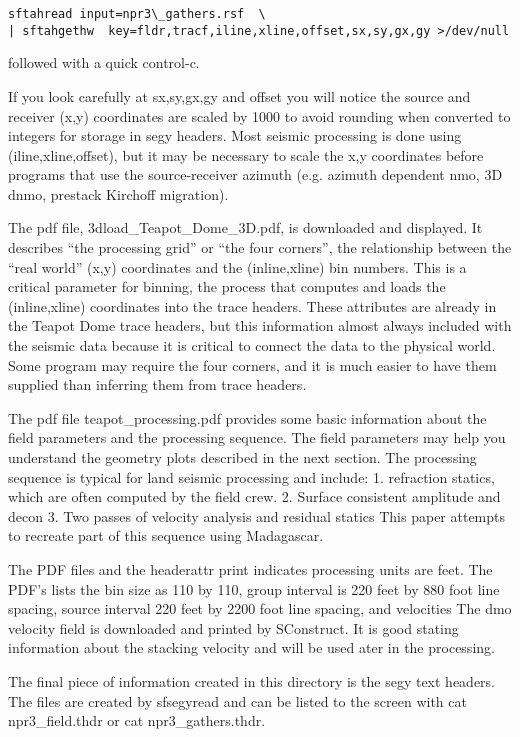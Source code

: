 \begin{verbatim}  
sftahread input=npr3\_gathers.rsf  \
| sftahgethw  key=fldr,tracf,iline,xline,offset,sx,sy,gx,gy >/dev/null
\end{verbatim}  

followed with a quick control-c.  

If you look carefully at sx,sy,gx,gy and offset you will notice the source and receiver (x,y) coordinates are scaled by 1000 to avoid rounding when converted to integers for storage in segy headers.  Most seismic processing is done using (iline,xline,offset), but it may be necessary to scale the x,y coordinates before programs that use the source-receiver azimuth (e.g. azimuth dependent nmo, 3D dnmo, prestack Kirchoff migration).

The pdf file, 3dload\_Teapot\_Dome\_3D.pdf, is downloaded and displayed.  It describes “the processing grid” or “the four corners”, the relationship between the “real world” (x,y) coordinates and the (inline,xline) bin numbers.  This is a critical parameter for binning, the process that computes and loads the (inline,xline) coordinates into the trace headers.  These attributes are already in the Teapot Dome trace headers, but this information almost always included with the seismic data because it is critical to connect the data to the physical world.  Some program may require the four corners, and it is much easier to have them supplied than inferring them from trace headers.

The pdf file teapot\_processing.pdf provides some basic information about the field parameters and the processing sequence.  The field parameters may help you understand the geometry plots described in the next section.  The processing sequence is typical for land seismic processing and include:
1.	refraction statics, which are often computed by the field crew.
2.	Surface consistent amplitude and decon
3.	Two passes of velocity analysis and residual statics
This paper attempts to recreate part of this sequence using Madagascar.

The PDF files and the headerattr print indicates processing units are feet.  The PDF’s lists the bin size as 110 by 110, group interval is 220 feet by 880 foot line spacing, source interval 220 feet by 2200 foot line spacing, and velocities
The dmo velocity field is downloaded and printed by SConstruct.  It is good stating information about the stacking velocity and will be used ater in the processing.

The final piece of information created in this directory is the segy text headers.   The files are created by sfsegyread and can be listed to the screen with cat npr3\_field.thdr or cat npr3\_gathers.thdr.  

